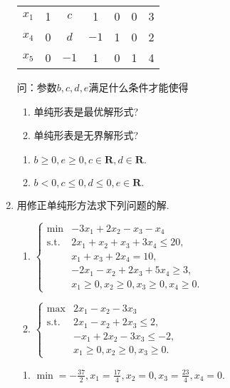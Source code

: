 \begin{enumerate}
\begin{center}
\begin{tabular}{ccccccc}
            $x_1$ & 1 & $c$ & 1 & 0 & 0 & 3\\
            $x_4$ & 0 & $d$ & $-1$ & 1 & 0 & 2\\
            $x_5$ & 0 & $-1$ & 1 & 0 & 1 & 4\\ \hline
        \end{tabular}
    \end{center}
    问：参数$b,c,d,e$满足什么条件才能使得
    \begin{enumerate}[label=(\arabic*)]
        \item 单纯形表是最优解形式?
        \item 单纯形表是无界解形式?
    \end{enumerate}
    \sol
    \begin{enumerate}[label=(\arabic*)]
        \item $b \geqslant 0, e \geqslant 0,c \in \textbf{R}, d \in \textbf{R}.$
        \item $b<0,c \leqslant 0, d \leqslant 0, e \in \textbf{R}.$
    \end{enumerate}
    \item 用修正单纯形方法求下列问题的解.
    \begin{enumerate}[label=(\arabic*)]
        \item $\begin{cases}
            \min & -3x_1+2x_2-x_3-x_4\\
            \text{s.t.} & 2x_1+x_2+x_3+3x_4 \leqslant 20,\\
            & x_1+x_3+2x_4 = 10,\\
            & -2x_1-x_2+2x_3+5x_4 \geqslant 3,\\
            & x_1 \geqslant 0, x_2 \geqslant 0, x_3 \geqslant 0, x_4 \geqslant 0.
        \end{cases}$
        \item $\begin{cases}
            \max & 2x_1-x_2-3x_3\\
            \text{s.t.} & 2x_1-x_2+2x_3 \leqslant 2,\\
            & -x_1+2x_2-3x_3 \leqslant -2,\\
            & x_1 \geqslant 0, x_2 \geqslant 0, x_3 \geqslant 0.
        \end{cases}$
    \end{enumerate}
    \sol
    \begin{enumerate}[label=(\arabic*)]
        \item $\displaystyle\min=-\frac{37}{2},x_1=\frac{17}{4},x_2=0,x_3=\frac{23}{4},x_4=0.$

\end{enumerate}
\end{enumerate}
